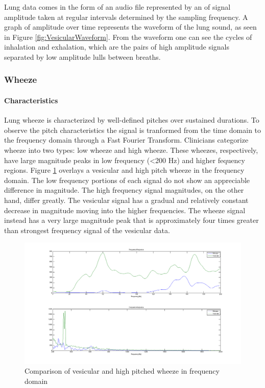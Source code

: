 \documentclass{article}
\begin{document}
Lung data comes in the form of an audio file represented by an of signal amplitude taken at regular intervals determined by the sampling frequency. A graph of amplitude over time represents the waveform of the lung sound, as seen in Figure \ref{fig:VesicularWaveform}. From the waveform one can see the cycles of inhalation and exhalation, which are the pairs of high amplitude signals separated by low amplitude lulls between breaths. \\

\subsubsection{Wheeze}

\paragraph{Characteristics}

Lung wheeze is characterized by well-defined pitches over sustained durations. To observe the pitch characteristics the signal is tranformed from the time domain to the frequency domain through a Fast Fourier Transform. Clinicians categorize wheeze into two types: low wheeze and high wheeze. These wheezes, respectively, have large magnitude peaks in low frequency (<200 Hz) and higher fequency regions. Figure \ref{fig:FFTVesicularWheeze} overlays a vesicular and high pitch wheeze in the frequency domain. The low frequency portions of each signal do not show an appreciable difference in magnitude. The high frequency signal magnitudes, on the other hand, differ greatly. The vesicular signal has a gradual and relatively constant decrease in magnitude moving into the higher frequencies. The wheeze signal instead has a very large magnitude peak that is approximately four times greater than strongest frequency signal of the vesicular data. \\

\begin{figure}[H]
	\includegraphics[width=\linewidth]{images/FFTVesicularWheeze.png}
	\caption{Comparison of vesicular and high pitched wheeze in frequency domain}
 	\label{fig:FFTVesicularWheeze}
\end{figure}
\end{document}
